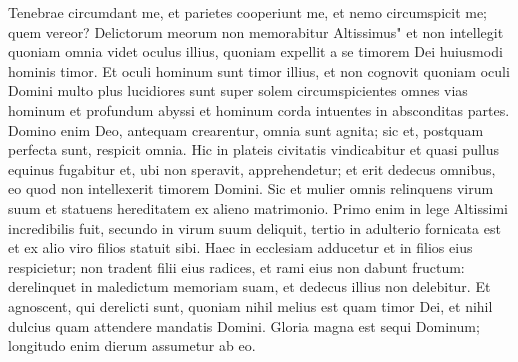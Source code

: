 \begin{biblechapter}
\verse Tenebrae circumdant me, et parietes cooperiunt me, et nemo circumspicit me; quem vereor? Delictorum meorum non memorabitur Altissimus" 
\verse et non intellegit quoniam omnia videt oculus illius, quoniam expellit a se timorem Dei huiusmodi hominis timor. Et oculi hominum sunt timor illius, 
\verse et non cognovit quoniam oculi Domini multo plus lucidiores sunt super solem circumspicientes omnes vias hominum et profundum abyssi et hominum corda intuentes in absconditas partes. 
\verse Domino enim Deo, antequam crearentur, omnia sunt agnita; sic et, postquam perfecta sunt, respicit omnia. 
\verse Hic in plateis civitatis vindicabitur et quasi pullus equinus fugabitur et, ubi non speravit, apprehendetur; 
\verse et erit dedecus omnibus, eo quod non intellexerit timorem Domini. 
\verse Sic et mulier omnis relinquens virum suum et statuens hereditatem ex alieno matrimonio. 
\verse Primo enim in lege Altissimi incredibilis fuit, secundo in virum suum deliquit, tertio in adulterio fornicata est et ex alio viro filios statuit sibi. 
\verse Haec in ecclesiam adducetur et in filios eius respicietur; 
\verse non tradent filii eius radices, et rami eius non dabunt fructum: 
\verse derelinquet in maledictum memoriam suam, et dedecus illius non delebitur. 
\verse Et agnoscent, qui derelicti sunt, quoniam nihil melius est quam timor Dei, et nihil dulcius quam attendere mandatis Domini. 
\verse Gloria magna est sequi Dominum; longitudo enim dierum assumetur ab eo. 
\end{biblechapter}

